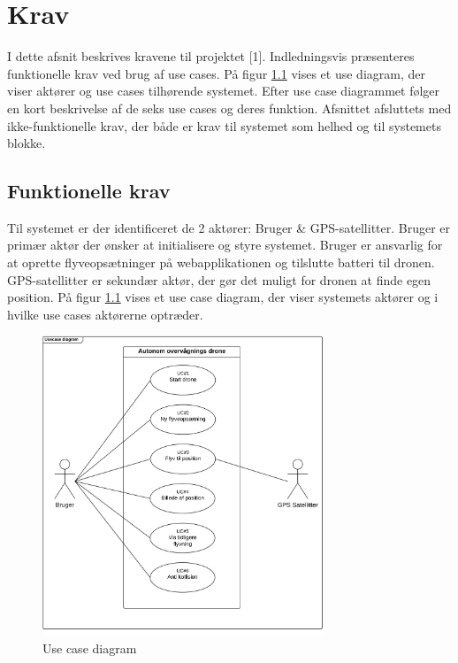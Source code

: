 \chapter{Krav}
\vspace{-0.5cm}
I dette afsnit beskrives kravene til projektet [1]. Indledningsvis præsenteres funktionelle krav  ved brug af use cases. På figur \ref{fig:useCaseDiagram} vises et use diagram, der viser aktører og use cases tilhørende systemet. Efter use case diagrammet følger en kort beskrivelse af de seks use cases og deres funktion. Afsnittet afsluttets med ikke-funktionelle krav, der både er krav til systemet som helhed og til systemets blokke.
\vspace{-0.3cm}

\section{Funktionelle krav}
\vspace{-0.2cm}
Til systemet er der identificeret de 2 aktører: Bruger \& GPS-satellitter. Bruger er primær aktør der ønsker at initialisere og styre systemet. Bruger er ansvarlig for at oprette flyveopsætninger på webapplikationen og tilslutte batteri til dronen.
GPS-satellitter er sekundær aktør, der gør det muligt for dronen at finde egen position. 
På figur \ref{fig:useCaseDiagram} vises et use case diagram, der viser systemets aktører og i hvilke use cases aktørerne optræder. 
\begin{figure}[H]
	\centering
	\includegraphics[width=0.75\textwidth]{Billeder/Krav/Use_case_diagram}
	\vspace{-0.3cm}	
	\caption{Use case diagram}
	\label{fig:useCaseDiagram}
\end{figure}

